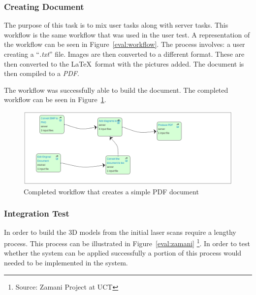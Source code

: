 \documentclass[12pt,a4paper]{report}
\begin{document}
\subsubsection{Creating Document}
The purpose of this task is to mix user tasks along with server tasks. This
workflow is the same workflow that was used in the user test. A representation
of the workflow can be seen in Figure~\ref{eval:workflow}.
The process involves: a user creating a ``\emph{.txt}'' file. Images are then
converted to a different format. These are then converted to the \LaTeX~format
with the pictures added. The document is then compiled to a \emph{PDF}.

The workflow was successfully able to build the document. The completed workflow
can be seen in Figure~\ref{eval:document}.

\begin{figure}[!h]
    \begin{center}
        \includegraphics[scale=0.45]{figures/document_test.png}
    \end{center}
    \caption{Completed workflow that creates a simple PDF document}
    \label{eval:document}
\end{figure}

\subsubsection{Integration Test}
In order to build the 3D models from the initial laser scans require a lengthy
process. This process can be illustrated in Figure~\ref{eval:zamani}
\footnote{Source: Zamani Project at UCT}.
 In order
to test whether the system can be applied successfully a portion of this process
would needed to be implemented in the system.
\end{document}
